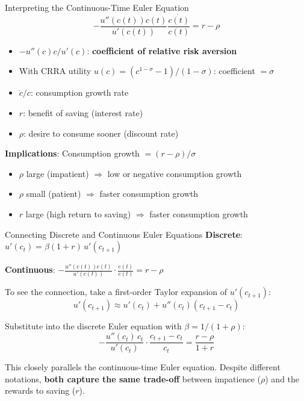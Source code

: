 \documentclass[blue]{beamer}
\begin{document}
\begin{frame}{Interpreting the Continuous-Time Euler Equation}
	\[
	-\frac{u''(c(t)) c(t)}{u'(c(t))} \frac{\dot{c(t)}}{c(t)} = r - \rho
	\]
	
	\begin{itemize}
		\item $-u''(c)c/u'(c)$: \textbf{coefficient of relative risk aversion}
		\item With CRRA utility $u(c) = (c^{1-\sigma}-1)/(1-\sigma)$: coefficient $= \sigma$
		\item $\dot{c}/c$: consumption growth rate
		\item $r$: benefit of saving (interest rate)
		\item $\rho$: desire to consume sooner (discount rate)
	\end{itemize}
	
	\bigskip
	\textbf{Implications}: Consumption growth $= (r - \rho)/\sigma$
	\begin{itemize}
		\item $\rho$ large (impatient) $\Rightarrow$ low or negative consumption growth
		\item $\rho$ small (patient) $\Rightarrow$ faster consumption growth
		\item $r$ large (high return to saving) $\Rightarrow$ faster consumption growth
	\end{itemize}
\end{frame}

\begin{frame}{Connecting Discrete and Continuous Euler Equations}
	\textbf{Discrete}: $u'(c_t) = \beta(1+r)\, u'(c_{t+1})$
	
	\textbf{Continuous}: $-\frac{u''(c(t))c(t)}{u'(c(t))} \cdot \frac{\dot{c(t)}}{c(t)} = r - \rho$
	
	\bigskip
	To see the connection, take a first-order Taylor expansion of $u'(c_{t+1})$:
	\[
	u'(c_{t+1}) \approx u'(c_t) + u''(c_t)(c_{t+1} - c_t)
	\]
	
	Substitute into the discrete Euler equation with $\beta = 1/(1+\rho)$:
	\[
	-\frac{u''(c_t)\, c_t}{u'(c_t)} \cdot \frac{c_{t+1} - c_t}{c_t} = \frac{r - \rho}{1+r}
	\]
	
	This closely parallels the continuous-time Euler equation. Despite different notations, \textbf{both capture the same trade-off} between impatience ($\rho$) and the rewards to saving ($r$).
\end{frame}

\end{document}

